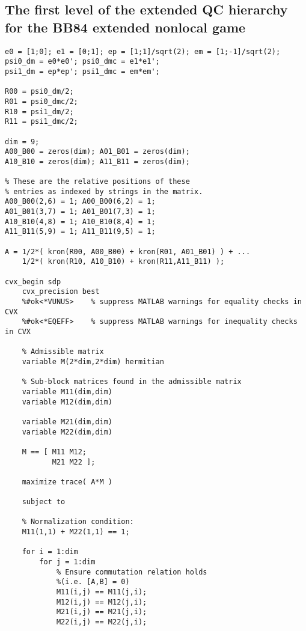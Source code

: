 \subsection{The first level of the extended QC hierarchy for the BB84 extended nonlocal game} \label{code:first-level-qc-hierarchy-bb84}

\begin{verbatim}
e0 = [1;0]; e1 = [0;1]; ep = [1;1]/sqrt(2); em = [1;-1]/sqrt(2);
psi0_dm = e0*e0'; psi0_dmc = e1*e1';
psi1_dm = ep*ep'; psi1_dmc = em*em';

R00 = psi0_dm/2;
R01 = psi0_dmc/2; 
R10 = psi1_dm/2;
R11 = psi1_dmc/2;  

dim = 9;
A00_B00 = zeros(dim); A01_B01 = zeros(dim); 
A10_B10 = zeros(dim); A11_B11 = zeros(dim); 

% These are the relative positions of these 
% entries as indexed by strings in the matrix. 
A00_B00(2,6) = 1; A00_B00(6,2) = 1;
A01_B01(3,7) = 1; A01_B01(7,3) = 1;
A10_B10(4,8) = 1; A10_B10(8,4) = 1;
A11_B11(5,9) = 1; A11_B11(9,5) = 1;

A = 1/2*( kron(R00, A00_B00) + kron(R01, A01_B01) ) + ...
	1/2*( kron(R10, A10_B10) + kron(R11,A11_B11) );

cvx_begin sdp
	cvx_precision best
    %#ok<*VUNUS>    % suppress MATLAB warnings for equality checks in CVX
    %#ok<*EQEFF>    % suppress MATLAB warnings for inequality checks in CVX 
    
    % Admissible matrix
    variable M(2*dim,2*dim) hermitian
    
    % Sub-block matrices found in the admissible matrix
    variable M11(dim,dim)
    variable M12(dim,dim)
    
    variable M21(dim,dim)
    variable M22(dim,dim)
            
    M == [ M11 M12;
    	   M21 M22 ];
       
    maximize trace( A*M )      
    
    subject to 
 
    % Normalization condition:
    M11(1,1) + M22(1,1) == 1;
        
    for i = 1:dim
        for j = 1:dim
            % Ensure commutation relation holds
            %(i.e. [A,B] = 0)            
            M11(i,j) == M11(j,i);
            M12(i,j) == M12(j,i);
            M21(i,j) == M21(j,i);
            M22(i,j) == M22(j,i);
            

\end{verbatim}
